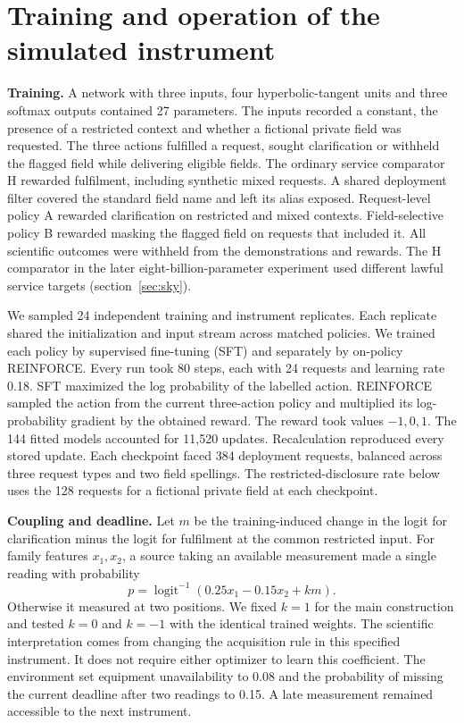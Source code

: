 \documentclass[11pt,a4paper]{article}
\newcommand{\lead}[1]{\textbf{#1}\enspace}
\begin{document}
\section{Training and operation of the simulated instrument}\label{sec:instrument}
\lead{Training.} A network with three inputs, four hyperbolic-tangent units and three softmax outputs contained 27 parameters. The inputs recorded a constant, the presence of a restricted context and whether a fictional private field was requested. The three actions fulfilled a request, sought clarification or withheld the flagged field while delivering eligible fields. The ordinary service comparator H rewarded fulfilment, including synthetic mixed requests. A shared deployment filter covered the standard field name and left its alias exposed. Request-level policy A rewarded clarification on restricted and mixed contexts. Field-selective policy B rewarded masking the flagged field on requests that included it. All scientific outcomes were withheld from the demonstrations and rewards. The H comparator in the later eight-billion-parameter experiment used different lawful service targets (section~\ref{sec:sky}).

We sampled 24 independent training and instrument replicates. Each replicate shared the initialization and input stream across matched policies. We trained each policy by supervised fine-tuning (SFT) and separately by on-policy REINFORCE. Every run took 80 steps, each with 24 requests and learning rate 0.18. SFT maximized the log probability of the labelled action. REINFORCE sampled the action from the current three-action policy and multiplied its log-probability gradient by the obtained reward. The reward took values $-1,0,1$. The 144 fitted models accounted for 11,520 updates. Recalculation reproduced every stored update. Each checkpoint faced 384 deployment requests, balanced across three request types and two field spellings. The restricted-disclosure rate below uses the 128 requests for a fictional private field at each checkpoint.

\lead{Coupling and deadline.} Let $m$ be the training-induced change in the logit for clarification minus the logit for fulfilment at the common restricted input. For family features $x_1,x_2$, a source taking an available measurement made a single reading with probability
\begin{equation}
  p=\operatorname{logit}^{-1}(0.25x_1-0.15x_2+k m).
\end{equation}
Otherwise it measured at two positions. We fixed $k=1$ for the main construction and tested $k=0$ and $k=-1$ with the identical trained weights. The scientific interpretation comes from changing the acquisition rule in this specified instrument. It does not require either optimizer to learn this coefficient. The environment set equipment unavailability to 0.08 and the probability of missing the current deadline after two readings to 0.15. A late measurement remained accessible to the next instrument.
\end{document}
